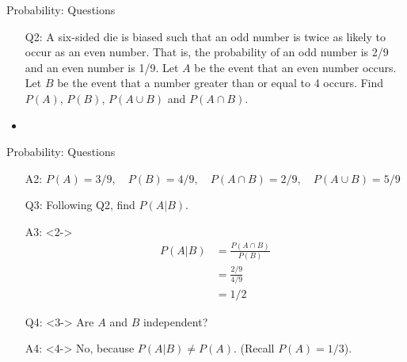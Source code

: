 \documentclass[10pt, handout, xcolor=table]{beamer}
\begin{document}
\begin{frame}{Probability: Questions}
\begin{itemize}
  \setlength{\itemsep}{15pt}
\item[Q2:] A six-sided die is biased such that an odd number is twice as likely to occur as an even number. That is, the probability of an odd number is 2/9 and an even number is 1/9. Let $A$ be the event that an even number occurs. Let $B$ be the event that a number greater than or equal to 4 occurs. Find $P(A)$, $P(B)$, $P(A \cup B)$ and $P(A \cap B)$.
\item<2->[A2:] 
\end{itemize}
\end{frame}

\begin{frame}{Probability: Questions}
\bigskip
\begin{itemize}
\setlength{\itemsep}{15pt}
\item[A2:] {\color{red} $P(A) = 3/9, \quad P(B) = 4/9, \quad P(A \cap B) = 2/9, \quad P(A \cup B) = 5/9$}
\item[Q3:] Following Q2, find $P(A|B)$.
\item[A3:]<2->{ \color{red}
\begin{align*}
P(A|B) &= \frac{P(A \cap B)}{P(B)} \\
&= \frac{2/9}{4/9}\\
&= 1/2
\end{align*}}
\item[Q4:]<3-> Are $A$ and $B$ independent?
\item[A4:]<4-> {\color{red} No, because $P(A|B) \neq P(A)$. (Recall $P(A) = 1/3$).}
\end{itemize}
\end{frame}
\end{document}
